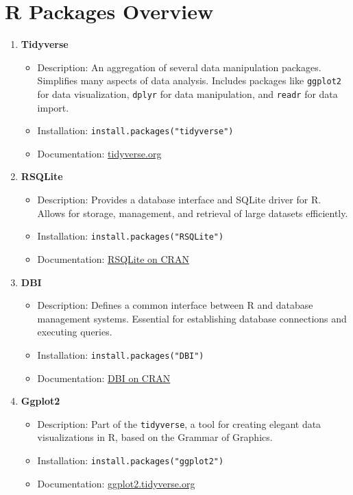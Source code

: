 \documentclass[11pt]{article}\usepackage[]{graphicx}\usepackage[]{xcolor}
\begin{document}
\section*{R Packages Overview}
\begin{enumerate}
    \item \textbf{Tidyverse}
    \begin{itemize}[noitemsep]
        \item Description: An aggregation of several data manipulation packages. Simplifies many aspects of data analysis. Includes packages like \texttt{ggplot2} for data visualization, \texttt{dplyr} for data manipulation, and \texttt{readr} for data import.
        \item Installation: \texttt{install.packages("tidyverse")}
        \item Documentation: \href{https://www.tidyverse.org/}{tidyverse.org}
    \end{itemize}

    \item \textbf{RSQLite}
    \begin{itemize}[noitemsep]
        \item Description: Provides a database interface and SQLite driver for R. Allows for storage, management, and retrieval of large datasets efficiently.
        \item Installation: \texttt{install.packages("RSQLite")}
        \item Documentation: \href{https://cran.r-project.org/web/packages/RSQLite/index.html}{RSQLite on CRAN}
    \end{itemize}

    \item \textbf{DBI}
    \begin{itemize}[noitemsep]
        \item Description: Defines a common interface between R and database management systems. Essential for establishing database connections and executing queries.
        \item Installation: \texttt{install.packages("DBI")}
        \item Documentation: \href{https://cran.r-project.org/web/packages/DBI/index.html}{DBI on CRAN}
    \end{itemize}

    \item \textbf{Ggplot2}
    \begin{itemize}[noitemsep]
        \item Description: Part of the \texttt{tidyverse}, a tool for creating elegant data visualizations in R, based on the Grammar of Graphics.
        \item Installation: \texttt{install.packages("ggplot2")}
        \item Documentation: \href{https://ggplot2.tidyverse.org/}{ggplot2.tidyverse.org}
    \end{itemize}


\end{enumerate}
\end{document}
